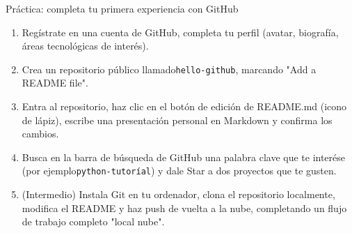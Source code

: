 \begin{tcbpractice}{Práctica: completa tu primera experiencia con GitHub}
\begin{enumerate}
  \item Regístrate en una cuenta de GitHub, completa tu perfil (avatar, biografía, áreas tecnológicas de interés).
  \item Crea un repositorio público llamado\texttt{hello-\allowbreak github}, marcando "Add a README file".
  \item Entra al repositorio, haz clic en el botón de edición de README.md (icono de lápiz), escribe una presentación personal en Markdown y confirma los cambios.
  \item Busca en la barra de búsqueda de GitHub una palabra clave que te interése (por ejemplo\texttt{python-\allowbreak tutoríal}) y dale Star a dos proyectos que te gusten.
  \item (Intermedio) Instala Git en tu ordenador, clona el repositorio localmente, modifica el README y haz push de vuelta a la nube, completando un flujo de trabajo completo "local nube".
\end{enumerate}

\end{tcbpractice}
